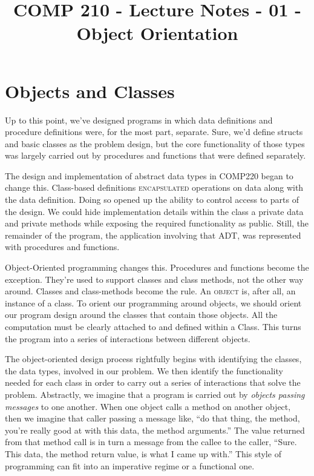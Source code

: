 \documentclass[]{tufte-handout}
\title{COMP 210 - Lecture Notes - 01 - Object Orientation}
\begin{document}
\maketitle

\begin{abstract}

\end{abstract}

\section{Objects and Classes}

Up to this point, we've designed programs in which data definitions and procedure definitions were, for the most part, separate. Sure, we'd define structs and basic classes as the problem design, but the core functionality of those types was largely carried out by procedures and functions that were defined separately. 

The design and implementation of abstract data types in COMP220 began to change this. Class-based definitions \textsc{encapsulated} operations on data along with the data definition. Doing so opened up the ability to control access to parts of the design. We could hide implementation details within the class a private data and private methods while exposing the required functionality as public. Still, the remainder of the program, the application involving that ADT, was represented with procedures and functions. 

Object-Oriented programming changes this.  Procedures and functions become the exception.  They're used to support classes and class methods, not the other way around. Classes and class-methods become the rule. An \textsc{object} is, after all, an instance of a class.  To orient our programming around objects, we should orient our program design around the classes that contain those objects.  All the computation must be clearly attached to and defined within a Class. This turns the program into a series of interactions between different objects. 
 
The object-oriented design process rightfully begins with identifying the classes, the data types, involved in our problem.  We then identify the functionality needed for each class in order to carry out a series of interactions that solve the problem. Abstractly, we imagine that a program is carried out by \textit{objects passing messages} to one another. When one object calls a method on another object, then we imagine that caller passing a message like, ``do that thing, the method, you're really good at with this data, the method arguments.'' The value returned from that method call is in turn a message from the callee to the caller, ``Sure. This data, the method return value, is what I came up with.'' This style of programming can fit into an imperative regime or a functional one. 
\end{document}
